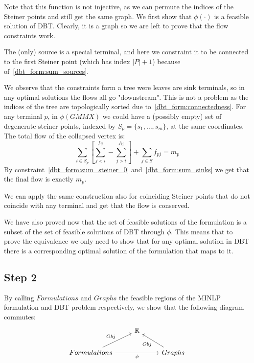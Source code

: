 \documentclass[11pt,reqno,a4paper]{amsart}
\numberwithin{equation}{section}
\theoremstyle{mytheorem}
\theoremstyle{myremark}
\theoremstyle{myparagraph}
\begin{document}
    Note that this function is not injective, as we can permute the indices of the Steiner points and still get the same graph.
    We first show that $\phi(\cdot)$ is a feasible solution of DBT. Clearly, it is a graph so we are left to prove that the flow
    constraints work.

    The (only) source is a special terminal, and here we constraint it to be connected
    to the first Steiner point (which has index $|P|+1$) because of~\ref{dbt_form:sum_sources}.

    We observe that the constraints form a tree were leaves are sink terminals, so in any optimal solutions the flows all go "downstream".
    This is not a problem as the indices of the tree are topologically sorted due to~\ref{dbt_form:connectedness}.
    For any terminal $p$, in $\phi(GMMX)$ we could have a (possibly empty) set of degenerate steiner points, indexed by $S_p = \{s_1, \dots, s_m\}$,
    at the same coordinates.
    The total flow of the collapsed vertex is:
    \begin{equation}
        \sum_{i \in S_p} \left[ \sum_{j<i}^{f_{ji}} - \sum_{j>i}^{f_{ij}}   \right] + \sum_{j \in S} f_{pj} = m_p
    \end{equation}
    By constraint~\ref{dbt_form:sum_steiner_0} and~\ref{dbt_form:sum_sinks} we get that the final flow is exactly $m_p$.

    We can apply the same construction also for coinciding Steiner points that do not coincide with any terminal and get
    that the flow is conserved.

    We have also proved now that the set of feasible solutions of the formulation is a subset of the set of feasible solutions of DBT through $\phi$.
    This means that to prove the equivalence we only need to show that for any optimal solution in DBT
    there is a corresponding optimal solution of the formulation that maps to it.

    \subsection{Step 2}
    By calling $Formulations$ and $Graphs$ the feasible regions of the MINLP formulation and DBT problem respectively, we show that the following diagram commutes:
    \[
        \begin{tikzcd}
            & \mathbb{R}  \\
            Formulations \arrow[ur, "Obj"] \arrow[rr, "\phi"'] & & Graphs  \arrow[ul, "Obj"]
        \end{tikzcd}
    \]
\end{document}
